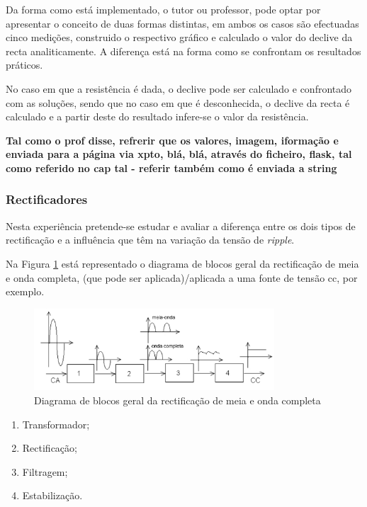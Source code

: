 Da forma como está implementado, o tutor ou professor, pode optar por apresentar o conceito de duas formas distintas, em ambos os casos são efectuadas cinco medições, construido o respectivo gráfico e calculado o valor do declive da recta analiticamente. A diferença está na forma como se confrontam os resultados práticos. 

No caso em que a resistência é dada, o declive pode ser calculado e confrontado com as soluções, sendo que no caso em que é desconhecida, o declive da recta é calculado e a partir deste do resultado infere-se o valor da resistência. 

\textbf{Tal como o prof disse, refrerir que os valores, imagem, iformação e enviada para a página via xpto, blá, blá, através do ficheiro, flask, tal como referido no cap tal - referir também como é enviada a string}

\subsubsection{Rectificadores}
\label{sec:rectificadoresfiltros}

Nesta experiência pretende-se estudar e avaliar a diferença entre os dois tipos de rectificação e a influência que têm na variação da tensão de \textit{ripple}. 

Na Figura \ref{fig:blocosrectificacao} está representado o diagrama de blocos geral da rectificação de meia e onda completa, (que pode ser aplicada)/aplicada a uma fonte de tensão \acrshort{cc}, por exemplo. 

\begin{figure}[hbtp]
	\centering
	\includegraphics[width=0.8\textwidth]{figures/diagramablocosrectificacao.png}
	\caption{Diagrama de blocos geral da rectificação de meia e onda completa}
	\label{fig:blocosrectificacao}
\end{figure}

\begin{enumerate}
	\item Transformador;
	\item Rectificação;
	\item Filtragem;
	\item Estabilização.
\end{enumerate}

